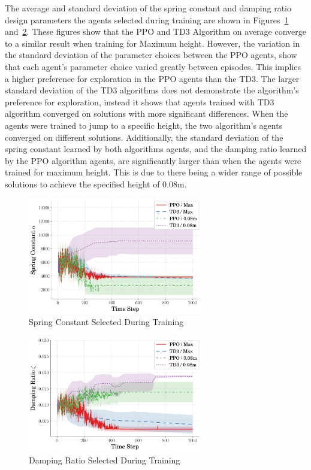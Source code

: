 \documentclass[10pt,twocolumn,letterpaper]{article}
\begin{document}
The average and standard deviation of the spring constant and damping ratio design parameters the agents selected during training are shown in Figures~\ref{fig:spring_vs_step} and~\ref{fig:zeta_vs_step}. 
These figures show that the PPO and TD3 Algorithm on average converge to a similar result when training for Maximum height. However, the variation in the standard deviation of the parameter choices between the PPO agents, show that each agent's parameter choice varied greatly between episodes. This implies a higher preference for exploration in the PPO agents than the TD3. The larger standard deviation of the TD3 algorithms does not demonstrate the algorithm's preference for exploration, instead it shows that agents trained with TD3 algorithm converged on solutions with more significant differences.
When the agents were trained to jump to a specific height, the two algorithm's agents converged on different solutions. Additionally, the standard deviation of the spring constant learned by both algorithms agents, and the damping ratio learned by the PPO algorithm agents, are significantly larger than when the agents were trained for maximum height. This is due to there being a wider range of possible solutions to achieve the specified height of 0.08m.
%
\begin{figure}[tb]
        \begin{center}
        \includegraphics[width = 3in]{figures/ppo_vs_td3/avg_spring_comp.png}  
        \caption{Spring Constant Selected During Training}
        \label{fig:spring_vs_step}
        \end{center}
        \end{figure}
%
\begin{figure}[tb]
        \begin{center}
        \includegraphics[width = 3in]{figures/ppo_vs_td3/avg_zeta_comp.png}  
        \caption{Damping Ratio Selected During Training}
        \label{fig:zeta_vs_step}
        \end{center}
        \end{figure}
\end{document}

